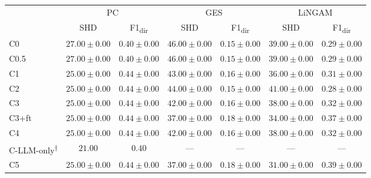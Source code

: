 \begin{tabular}{l|cc|cc|cc}
\hline
 & \multicolumn{2}{c|}{PC} & \multicolumn{2}{c|}{GES} & \multicolumn{2}{c}{LiNGAM} \\
 & SHD & F1\textsubscript{dir} & SHD & F1\textsubscript{dir} & SHD & F1\textsubscript{dir} \\
\hline
C0 & $27.00 \pm 0.00$ & $0.40 \pm 0.00$ & $46.00 \pm 0.00$ & $0.15 \pm 0.00$ & $39.00 \pm 0.00$ & $0.29 \pm 0.00$ \\
C0.5 & $27.00 \pm 0.00$ & $0.40 \pm 0.00$ & $46.00 \pm 0.00$ & $0.15 \pm 0.00$ & $39.00 \pm 0.00$ & $0.29 \pm 0.00$ \\
C1 & $25.00 \pm 0.00$ & $0.44 \pm 0.00$ & $43.00 \pm 0.00$ & $0.16 \pm 0.00$ & $36.00 \pm 0.00$ & $0.31 \pm 0.00$ \\
C2 & $25.00 \pm 0.00$ & $0.44 \pm 0.00$ & $44.00 \pm 0.00$ & $0.15 \pm 0.00$ & $41.00 \pm 0.00$ & $0.28 \pm 0.00$ \\
C3 & $25.00 \pm 0.00$ & $0.44 \pm 0.00$ & $42.00 \pm 0.00$ & $0.16 \pm 0.00$ & $38.00 \pm 0.00$ & $0.32 \pm 0.00$ \\
C3+ft & $25.00 \pm 0.00$ & $0.44 \pm 0.00$ & $37.00 \pm 0.00$ & $0.18 \pm 0.00$ & $34.00 \pm 0.00$ & $0.37 \pm 0.00$ \\
C4 & $25.00 \pm 0.00$ & $0.44 \pm 0.00$ & $42.00 \pm 0.00$ & $0.16 \pm 0.00$ & $38.00 \pm 0.00$ & $0.32 \pm 0.00$ \\
C-LLM-only\textsuperscript{$\dagger$} & $21.00$ & $0.40$ & --- & --- & --- & --- \\ %
C5 & $25.00 \pm 0.00$ & $0.44 \pm 0.00$ & $37.00 \pm 0.00$ & $0.18 \pm 0.00$ & $31.00 \pm 0.00$ & $0.39 \pm 0.00$ \\
\hline
\end{tabular}
